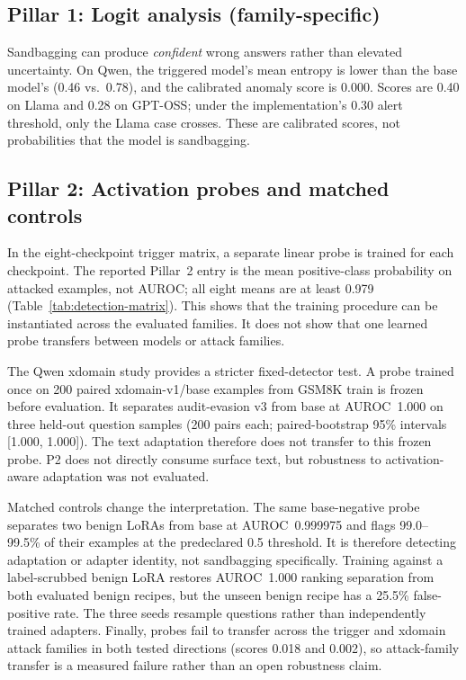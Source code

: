 \documentclass{article}
\begin{document}
\subsection{Pillar 1: Logit analysis (family-specific)}
\label{sec:pillar1}
Sandbagging can produce \emph{confident} wrong answers rather than elevated uncertainty. On Qwen, the triggered model's mean entropy is lower than the base model's (0.46 vs.\ 0.78), and the calibrated anomaly score is 0.000. Scores are 0.40 on Llama and 0.28 on GPT-OSS; under the implementation's 0.30 alert threshold, only the Llama case crosses. These are calibrated scores, not probabilities that the model is sandbagging.

\subsection{Pillar 2: Activation probes and matched controls}
\label{sec:pillar2}
In the eight-checkpoint trigger matrix, a separate linear probe is trained for each checkpoint. The reported Pillar~2 entry is the mean positive-class probability on attacked examples, not AUROC; all eight means are at least 0.979 (Table~\ref{tab:detection-matrix}). This shows that the training procedure can be instantiated across the evaluated families. It does not show that one learned probe transfers between models or attack families.

The Qwen xdomain study provides a stricter fixed-detector test. A probe trained once on 200 paired xdomain-v1/base examples from GSM8K train is frozen before evaluation. It separates audit-evasion v3 from base at AUROC~1.000 on three held-out question samples (200 pairs each; paired-bootstrap 95\% intervals [1.000, 1.000]). The text adaptation therefore does not transfer to this frozen probe. P2 does not directly consume surface text, but robustness to activation-aware adaptation was not evaluated.

Matched controls change the interpretation. The same base-negative probe separates two benign LoRAs from base at AUROC~0.999975 and flags 99.0--99.5\% of their examples at the predeclared 0.5 threshold. It is therefore detecting adaptation or adapter identity, not sandbagging specifically. Training against a label-scrubbed benign LoRA restores AUROC~1.000 ranking separation from both evaluated benign recipes, but the unseen benign recipe has a 25.5\% false-positive rate. The three seeds resample questions rather than independently trained adapters. Finally, probes fail to transfer across the trigger and xdomain attack families in both tested directions (scores 0.018 and 0.002), so attack-family transfer is a measured failure rather than an open robustness claim.
\end{document}
